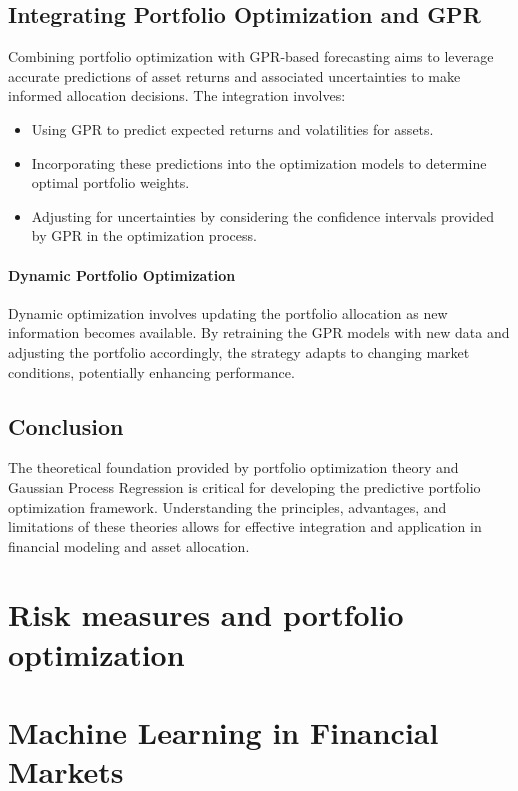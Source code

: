 \subsection{Integrating Portfolio Optimization and GPR}

Combining portfolio optimization with GPR-based forecasting aims to leverage accurate predictions of asset returns and associated uncertainties to make informed allocation decisions. The integration involves:

\begin{itemize}
    \item Using GPR to predict expected returns and volatilities for assets.
    \item Incorporating these predictions into the optimization models to determine optimal portfolio weights.
    \item Adjusting for uncertainties by considering the confidence intervals provided by GPR in the optimization process.
\end{itemize}

\paragraph{Dynamic Portfolio Optimization}

Dynamic optimization involves updating the portfolio allocation as new information becomes available. By retraining the GPR models with new data and adjusting the portfolio accordingly, the strategy adapts to changing market conditions, potentially enhancing performance.

\subsection{Conclusion}

The theoretical foundation provided by portfolio optimization theory and Gaussian Process Regression is critical for developing the predictive portfolio optimization framework. Understanding the principles, advantages, and limitations of these theories allows for effective integration and application in financial modeling and asset allocation.


\section{Risk measures and portfolio optimization}

\section{Machine Learning in Financial Markets}

